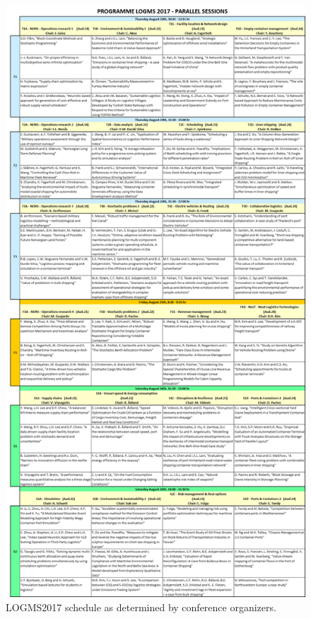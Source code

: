 \documentclass[a4paper, 12pt, twoside]{article}
\numberwithin{equation}{section} %
\begin{document}
\begin{figure}[H]

  \centering
  \includegraphics[scale=0.40]{LOGMS_Actual_Schedule.png}
\caption{LOGMS2017 schedule as determined by conference organizers.}
\label{fig:LOGMS2017 Actual schedule}
\end{figure}
\end{document}
